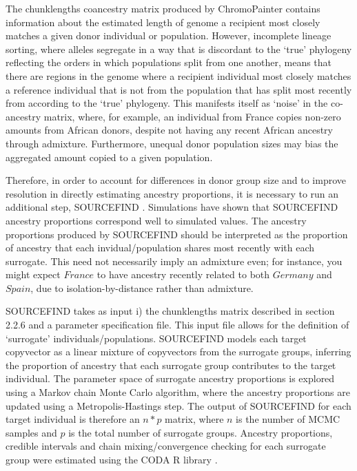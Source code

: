 The chunklengths coancestry matrix produced by ChromoPainter contains information about the estimated length of genome a recipient most closely matches a given donor individual or population. However, incomplete lineage sorting, where alleles segregate in a way that is discordant to the `true' phylogeny reflecting the orders in which populations split from one another, means that there are regions in the genome where a recipient individual most closely matches a reference individual that is not from the population that has split most recently from according to the `true' phylogeny. This manifests itself as `noise' in the co-ancestry matrix, where, for example, an individual from France copies non-zero amounts from African donors, despite not having any recent African ancestry through admixture.  Furthermore, unequal donor population sizes may bias the aggregated amount copied to a given population. 

Therefore, in order to account for differences in donor group size and to improve resolution in directly estimating ancestry proportions, it is necessary to run an additional step, SOURCEFIND \cite{Chacon-Duque2018}. Simulations have shown that SOURCEFIND ancestry proportions correspond well to simulated values. The ancestry proportions produced by SOURCEFIND should be interpreted as the proportion of ancestry that each invidual/population shares most recently with each surrogate. This need not necessarily imply an admixture even; for instance, you might expect $France$ to have ancestry recently related to both $Germany$ and $Spain$, due to isolation-by-distance rather than admixture. 

SOURCEFIND takes as input i) the chunklengths matrix described in section 2.2.6 and a parameter specification file. This input file allows for the definition of `surrogate' individuals/populations. SOURCEFIND models each target copyvector as a linear mixture of copyvectors from the surrogate groups, inferring the proportion of ancestry that each surrogate group contributes to the target individual. The parameter space of surrogate ancestry proportions is explored using a Markov chain Monte Carlo algorithm, where the ancestry proportions are updated using a Metropolis-Hastings step. The output of SOURCEFIND for each target individual is therefore an $n*p$ matrix, where $n$ is the number of MCMC samples and $p$ is the total number of surrogate groups. Ancestry proportions, credible intervals and chain mixing/convergence checking for each surrogate group were estimated using the CODA R library \cite{oro22547}.

